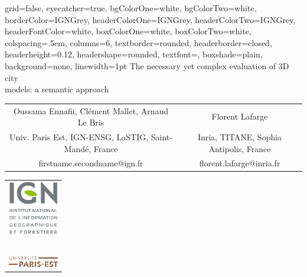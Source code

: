 \documentclass[portrait, a0paper, margin=.5cm]{baposter}
\begin{document}
    \begin{poster}%
    {
        grid=false,
        eyecatcher=true,
        bgColorOne=white,
        bgColorTwo=white,
        borderColor=IGNGrey,
        headerColorOne=IGNGrey,
        headerColorTwo=IGNGrey,
        headerFontColor=white,
        boxColorOne=white,
        boxColorTwo=white,
        colspacing=.5em,
        columns=6,
        textborder=rounded,
        headerborder=closed,
        headerheight=0.12\textheight,
        headershape=rounded,
        textfont={\color{IGNDarkGrey}},
        boxshade=plain,
        background=none,
        linewidth=1pt
    }
    {}
    {
        \color{IGNDarkGrey}
        The necessary yet complex evaluation of 3D city\\models: a semantic approach
    }
    {
        \vspace{.5cm}
        \color{IGNDarkGrey}
        \begin{tabular}{c c}
            \small Oussama Ennafii, Clément Mallet, Arnaud Le Bris & \small Florent Lafarge\\
            \small Univ. Paris Est, IGN-ENSG, LaSTIG, Saint-Mandé, France & \small Inria, TITANE, Sophia Antipolis, France\\
            \small firstname.secondname@ign.fr & \small florent.lafarge@inria.fr
        \end{tabular}
    }
    {
        \begin{tabular}{c}
            \includegraphics[width=2.2cm]{images/theme/ign_logo}\\~\\
            \includegraphics[width=2.2cm]{images/theme/paris_est_logo}
        \end{tabular}
    }



\end{poster}
\end{document}
